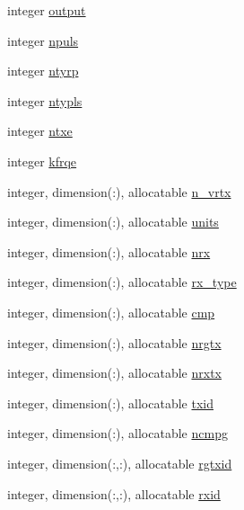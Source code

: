 \begin{DoxyCompactItemize}
integer \hyperlink{namespacemg__input__routines_a234f97288d737f186b0b6d42e1a814c6}{output}
\item 
integer \hyperlink{namespacemg__input__routines_ad360ffe705c8b4f06540f3b932cfceee}{npuls}
\item 
integer \hyperlink{namespacemg__input__routines_a4eb7045180f139626567bfcfd3c8a47b}{ntyrp}
\item 
integer \hyperlink{namespacemg__input__routines_a1ed0dfa7a7d1e414d233eb872ac6b470}{ntypls}
\item 
integer \hyperlink{namespacemg__input__routines_adcf11333203ba036b2614937ad871d98}{ntxe}
\item 
integer \hyperlink{namespacemg__input__routines_a7d0a5bd49c58f7353a16d46811fa6fb0}{kfrqe}
\item 
integer, dimension(\+:), allocatable \hyperlink{namespacemg__input__routines_a4c570440af762e32ddd4471fd251db81}{n\+\_\+vrtx}
\item 
integer, dimension(\+:), allocatable \hyperlink{namespacemg__input__routines_a6584411ca6eab9482783dbc2ac76657b}{units}
\item 
integer, dimension(\+:), allocatable \hyperlink{namespacemg__input__routines_ac29c1c1ff81a328ee04517d8c82e412e}{nrx}
\item 
integer, dimension(\+:), allocatable \hyperlink{namespacemg__input__routines_a38dac17cba9fbefbddbaba3132d72fdf}{rx\+\_\+type}
\item 
integer, dimension(\+:), allocatable \hyperlink{namespacemg__input__routines_aff413a8a8457c1b1ae4dc95fa3929e22}{cmp}
\item 
integer, dimension(\+:), allocatable \hyperlink{namespacemg__input__routines_a53e5187bb8d5de5ded517b9805249c2a}{nrgtx}
\item 
integer, dimension(\+:), allocatable \hyperlink{namespacemg__input__routines_a3aa7df29b322ecf88304eb186379ac60}{nrxtx}
\item 
integer, dimension(\+:), allocatable \hyperlink{namespacemg__input__routines_a190d393e9096530ede606f341fd3f384}{txid}
\item 
integer, dimension(\+:), allocatable \hyperlink{namespacemg__input__routines_ab931c6d3ad288e3913d59d1b5352da79}{ncmpg}
\item 
integer, dimension(\+:,\+:), allocatable \hyperlink{namespacemg__input__routines_a6f3e5551307f08834ddf664958d31c0b}{rgtxid}
\item 
integer, dimension(\+:,\+:), allocatable \hyperlink{namespacemg__input__routines_a94cbf0223e189e49ce9b4ed3de4dfb7c}{rxid}

\end{DoxyCompactItemize}
